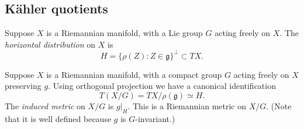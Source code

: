 \documentclass[12pt,letterpaper,reqno]{article}
\numberwithin{equation}{section}
\newcommand{\fg}{{\mathfrak g}}
\newcommand{\kahler}{K\"ahler\xspace}
\newcommand{\ti}[1]{\textit{#1}}
\newcommand{\fixme}[1]{{\color{orange}{[#1]}}}
\begin{document}

\fixme{...}


\subsection{\kahler quotients}

\begin{defn}
Suppose $X$ is a Riemannian manifold, with a Lie group
$G$ acting freely on $X$.
The \ti{horizontal distribution} on $X$ is
\begin{equation}
  H = \{ \rho(Z): Z \in \fg \}^\perp \subset TX.
\end{equation}
\end{defn}

\begin{defn}
Suppose $X$ is a Riemannian manifold, with a compact group
$G$ acting freely on $X$ preserving $g$.
Using orthogonal projection we have
a canonical identification
\begin{equation}
  T(X/G) = TX / \rho(\fg) \simeq H.
\end{equation}
The \ti{induced metric} on $X/G$ is $g \vert_H$.
This is a Riemannian metric on $X/G$.
(Note that it is well defined
because $g$ is $G$-invariant.)
\end{defn}
\end{document}
